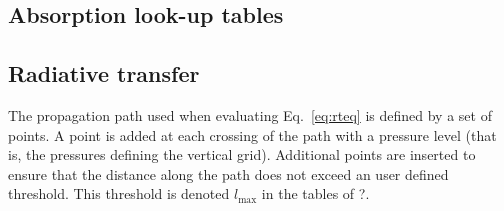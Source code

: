\subsection{Absorption look-up tables}
\label{sec:b:abstable}
%



\subsection{Radiative transfer}
\label{sec:b:rt}
%
The propagation path used when evaluating Eq.~\ref{eq:rteq} is defined by a set
of points. A point is added at each crossing of the path with a
pressure level (that is, the pressures defining the vertical grid). Additional
points are inserted to ensure that the distance along the path does not exceed
an user defined threshold. This threshold is denoted $l_\mathrm{max}$ in the
tables of ?.





